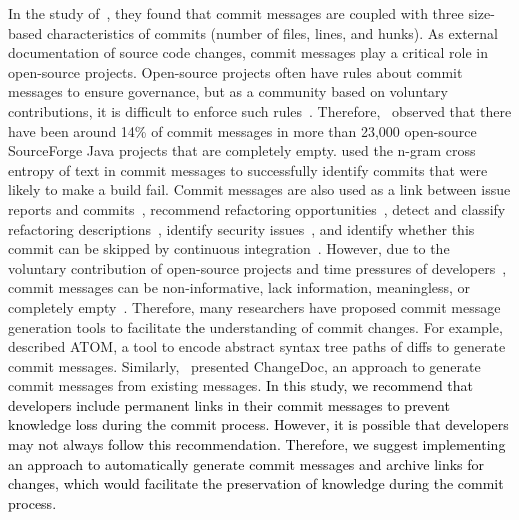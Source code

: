 \documentclass[smallextended]{svjour3}       %
\newcommand{\fix}[1]{\textcolor{black}{#1}}
\begin{document}
In the study of~\cite{alali2008s}, they found that commit messages are coupled with three size-based characteristics of commits (number of files, lines, and hunks).
As external documentation of source code changes, commit messages play a critical role in open-source projects.
Open-source projects often have rules about commit messages to ensure governance, but as a community based on voluntary contributions, it is difficult to enforce such rules~\citep{o2007emergence}. Therefore,~\cite{dyer2013boa} observed that there have been around 14\% of commit messages in more than 23,000 open-source SourceForge Java projects that are completely empty. \cite{santos2016judging} used the n-gram cross entropy of text in commit messages to successfully identify commits that were likely to make a build fail. Commit messages are also used as a link between issue reports and commits~\citep{xie2019deeplink}, recommend refactoring opportunities~\citep{rebai2020recommending}, detect and classify refactoring descriptions~\citep{krasniqi2020enhancing}, identify security issues~\citep{zhou2017automated}, and identify whether this commit can be skipped by continuous integration~\citep{abdalkareem2020machine}. 
However, due to the voluntary contribution of open-source projects and time pressures of developers~\citep{o2007emergence, maalej2009work, murphy2009attacking, d2010commit}, commit messages can be non-informative, lack information, meaningless, or completely empty~\citep{maalej2010can, tian2022makes, dyer2013boa, liu2020atom}. Therefore, many researchers have proposed commit message generation tools to facilitate \fix{the} understanding of commit changes. For example,~\cite{liu2020atom} described ATOM, a tool to encode abstract syntax tree paths of diffs to generate commit messages. Similarly,~\cite{huang2020learning} presented ChangeDoc, an approach to generate commit messages from existing messages. \fix{In this study, we recommend that developers include permanent links in their commit messages to prevent knowledge loss during the commit process. However, it is possible that developers may not always follow this recommendation. Therefore, we suggest implementing an approach to automatically generate commit messages and archive links for changes, which would facilitate the preservation of knowledge during the commit process.   }
\end{document}
